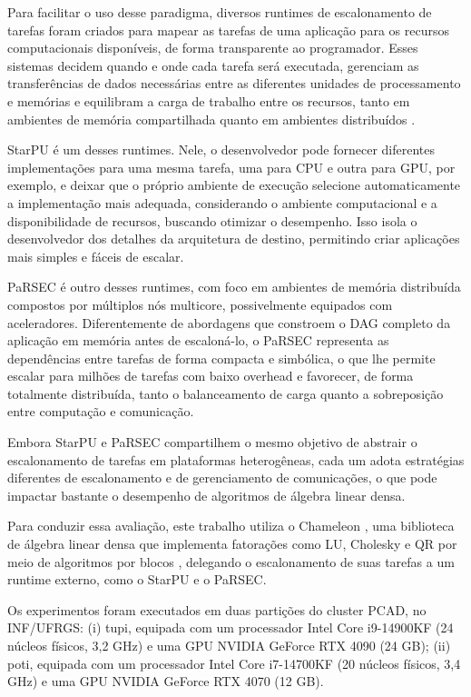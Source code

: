 \documentclass[12pt]{article}
\begin{document}
Para facilitar o uso desse paradigma, diversos runtimes de escalonamento de tarefas foram criados para mapear as tarefas de uma aplicação para os recursos computacionais disponíveis, de forma transparente ao programador. Esses sistemas decidem quando e onde cada tarefa será executada, gerenciam as transferências de dados necessárias entre as diferentes unidades de processamento e memórias e equilibram a carga de trabalho entre os recursos, tanto em ambientes de memória compartilhada quanto em ambientes distribuídos \cite{aguerrebere2018hdr}.

StarPU \cite{starpu} é um desses runtimes. Nele, o desenvolvedor pode fornecer diferentes implementações para uma mesma tarefa, uma para CPU e outra para GPU, por exemplo, e deixar que o próprio ambiente de execução selecione automaticamente a implementação mais adequada, considerando o ambiente computacional e a disponibilidade de recursos, buscando otimizar o desempenho. Isso isola o desenvolvedor dos detalhes da arquitetura de destino, permitindo criar aplicações mais simples e fáceis de escalar.

PaRSEC \cite{bosilca2011dague} é outro desses runtimes, com foco em ambientes de memória distribuída compostos por múltiplos nós multicore, possivelmente equipados com aceleradores. Diferentemente de abordagens que constroem o DAG completo da aplicação em memória antes de escaloná-lo, o PaRSEC representa as dependências entre tarefas de forma compacta e simbólica, o que lhe permite escalar para milhões de tarefas com baixo overhead e favorecer, de forma totalmente distribuída, tanto o balanceamento de carga quanto a sobreposição entre computação e comunicação.

Embora StarPU e PaRSEC compartilhem o mesmo objetivo de abstrair o escalonamento de tarefas em plataformas heterogêneas, cada um adota estratégias diferentes de escalonamento e de gerenciamento de comunicações, o que pode impactar bastante o desempenho de algoritmos de álgebra linear densa.

Para conduzir essa avaliação, este trabalho utiliza o Chameleon \cite{AGULLO2012473}, uma biblioteca de álgebra linear densa que implementa fatorações como LU, Cholesky e QR por meio de algoritmos por blocos \cite{DBLP}, delegando o escalonamento de suas tarefas a um runtime externo, como o StarPU e o PaRSEC.

Os experimentos foram executados em duas partições do cluster PCAD, no INF/UFRGS: (i) tupi, equipada com um processador Intel Core i9-14900KF (24 núcleos físicos, 3,2 GHz) e uma GPU NVIDIA GeForce RTX 4090 (24 GB); (ii) poti, equipada com um processador Intel Core i7-14700KF (20 núcleos físicos, 3,4 GHz) e uma GPU NVIDIA GeForce RTX 4070 (12 GB).
\end{document}
